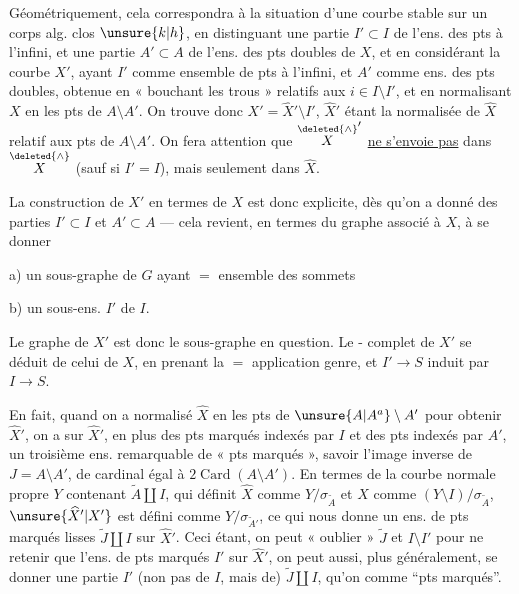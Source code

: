 Géométriquement, cela correspondra à la situation d'une courbe stable  sur un corps alg. clos $\unsure{k|h}$, en distinguant une partie $I'\subset I$ de l'ens. des pts à l'infini, et une partie $A'\subset A$ de l'ens. des pts doubles de $X$,
et en considérant la courbe $X'$, ayant $I'$ comme ensemble de pts à l'infini, et $A'$ comme ens. des pts doubles, obtenue en « bouchant les trous » relatifs aux $i\in I\setminus I'$,  et en normalisant $X$ en les pts de $A\setminus A'$. On trouve donc $X'=\widehat X'\setminus I'$, $\widehat X'$ étant la normalisée de $\widehat X$ relatif aux pts de $A\setminus A'$. On fera attention que $\overset{\deleted{\wedge}}{X}'$ \uline{ne s'envoie pas} dans $\overset{\deleted{\wedge}}{X}$ (sauf si $I'=I$), mais seulement dans $\widehat X$.

 La construction de $X'$ en termes de $X$ est donc explicite, dès qu'on a donné des parties $I'\subset I$ et $A'\subset A$ --- cela revient, en termes du  graphe associé à $X$, à se donner

\noindent a) un sous-graphe  de $G$ ayant $=$ ensemble des sommets

\noindent b) un sous-ens. $I'$ de $I$.

 Le graphe de $X'$ est donc le sous-graphe en question. Le -
complet de $X'$ se déduit de celui de $X$, en prenant la $=$ application genre, et $I'\longrightarrow S$ induit par $I\longrightarrow S$.

En fait, quand on a normalisé $\widehat X$ en les pts de $\unsure{A|A^{a}}\setminus A'$ pour obtenir $\widehat X'$, on a sur $\widehat X'$, en plus des pts marqués indexés par $I$ et des pts  indexés par $A'$, un troisième ens. remarquable de « pts marqués », savoir l'image inverse  de $J=A\setminus A'$,  de cardinal égal à $2\operatorname{Card}(A\setminus A')$. En termes de la courbe normale propre $Y$  contenant $\widetilde A\amalg I$, qui définit $\widehat X$ comme $Y/\sigma_{\widetilde A}$ et $X$ comme $(Y\setminus I)/\sigma_{\widetilde A}$, $\unsure{\widehat X'|X'}$ est défini comme $Y/\sigma_{\widetilde A'}$, ce qui nous donne un ens. de pts marqués lisses  $\widetilde J\amalg I$ sur $\widehat X'$. Ceci étant, on peut « oublier » $\widetilde J$ et $I\setminus I'$ pour ne retenir que l'ens. de pts marqués
$I'$ sur $\widehat X'$, on peut aussi, plus généralement, se donner une partie $I'$ (non pas de $I$, mais de) $\widetilde J\amalg I$, qu'on  comme ``pts marqués''.

